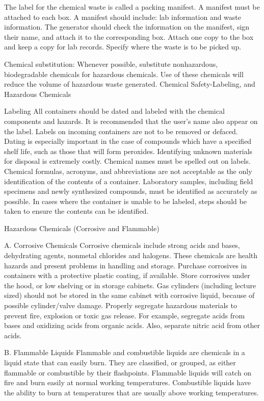 \documentclass[12pt]{../SOP2}
\begin{document}
The label for the chemical waste is called a packing manifest. A manifest must be attached to each box. A manifest should include: lab information and waste information. The generator should check the information on the manifest, sign their name, and attach it to the corresponding box. 
Attach one copy to the box and keep a copy for lab records. Specify where the waste is to be picked up. 

Chemical substitution:
Whenever possible, substitute nonhazardous, biodegradable chemicals for hazardous chemicals. Use of these chemicals will reduce the volume of hazardous waste generated. 
Chemical Safety-Labeling, and Hazardous Chemicals

Labeling
All containers should be dated and labeled with the chemical components and hazards. It is recommended that the user’s name also appear on the label. Labels on incoming containers are not to be removed or defaced. 
Dating is especially important in the case of compounds which have a specified shelf life, such as those that will form peroxides. Identifying unknown materials for disposal is extremely costly. 
Chemical names must be spelled out on labels. Chemical formulas, acronyms, and abbreviations are not acceptable as the only identification of the contents of a container. Laboratory samples, including field specimens and newly synthesized compounds, must be identified as accurately as possible. In cases where the container is unable to be labeled, steps should be taken to ensure the contents can be identified.

Hazardous Chemicals (Corrosive and Flammable)

A. Corrosive Chemicals 
Corrosive chemicals include strong acids and bases, dehydrating agents, nonmetal chlorides and halogens. These chemicals are health hazards and present problems in handling and storage. Purchase corrosives in containers with a protective plastic coating, if available.  Store corrosives under the hood, or low shelving or in storage cabinets. Gas cylinders (including lecture sized) should not be stored in the same cabinet with corrosive liquid, because of possible cylinder/valve damage.  Properly segregate hazardous materials to prevent fire, explosion or toxic gas release. For example, segregate acids from bases and oxidizing acids from organic acids. Also, separate nitric acid from other acids. 

B. Flammable Liquids 
Flammable and combustible liquids are chemicals in a liquid state that can easily burn. They are classified, or grouped, as either flammable or combustible by their flashpoints. Flammable liquids will catch on fire and burn easily at normal working temperatures. Combustible liquids have the ability to burn at temperatures that are usually above working temperatures.
\end{document}
